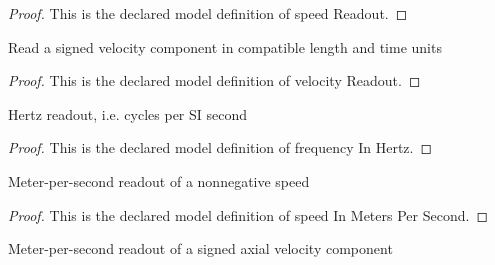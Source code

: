 \begin{proof}
  This is the declared model definition of speed Readout.
\end{proof}
\begin{definition}
  \label{def:physics:phyx-mini-0197:phyxminiproblems-problemphyxmini0197-velocityreadout}
  Read a signed velocity component in compatible length and time units
\end{definition}
\begin{proof}
  This is the declared model definition of velocity Readout.
\end{proof}
\begin{definition}
  \label{def:physics:phyx-mini-0197:phyxminiproblems-problemphyxmini0197-frequencyinhertz}
  Hertz readout, i.e. cycles per SI second
\end{definition}
\begin{proof}
  This is the declared model definition of frequency In Hertz.
\end{proof}
\begin{definition}
  \label{def:physics:phyx-mini-0197:phyxminiproblems-problemphyxmini0197-speedinmeterspersecond}
  Meter-per-second readout of a nonnegative speed
\end{definition}
\begin{proof}
  This is the declared model definition of speed In Meters Per Second.
\end{proof}
\begin{definition}
  \label{def:physics:phyx-mini-0197:phyxminiproblems-problemphyxmini0197-velocityinmeterspersecond}
  Meter-per-second readout of a signed axial velocity component
\end{definition}
